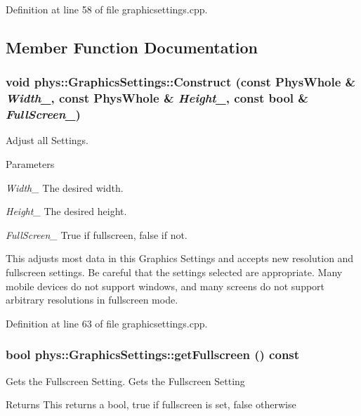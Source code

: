 Definition at line 58 of file graphicsettings.cpp.

\subsection{Member Function Documentation}
\hypertarget{classphys_1_1GraphicsSettings_aa8107167a2094f757f409db36e088171}{
\subsubsection[{Construct}]{\setlength{\rightskip}{0pt plus 5cm}void phys::GraphicsSettings::Construct (const PhysWhole \& {\em Width\_\-}, \/  const PhysWhole \& {\em Height\_\-}, \/  const bool \& {\em FullScreen\_\-})}}
\label{dc/df1/classphys_1_1GraphicsSettings_aa8107167a2094f757f409db36e088171}


Adjust all Settings. 
\begin{DoxyParams}{Parameters}
\item[{\em Width\_\-}]The desired width. \item[{\em Height\_\-}]The desired height. \item[{\em FullScreen\_\-}]True if fullscreen, false if not.\end{DoxyParams}
This adjusts most data in this Graphics Settings and accepts new resolution and fullscreen settings. Be careful that the settings selected are appropriate. Many mobile devices do not support windows, and many screens do not support arbitrary resolutions in fullscreen mode. 

Definition at line 63 of file graphicsettings.cpp.\hypertarget{classphys_1_1GraphicsSettings_a8871ea7d5c65c3b59d1d34b59531743f}{
\subsubsection[{getFullscreen}]{\setlength{\rightskip}{0pt plus 5cm}bool phys::GraphicsSettings::getFullscreen () const}}
\label{dc/df1/classphys_1_1GraphicsSettings_a8871ea7d5c65c3b59d1d34b59531743f}


Gets the Fullscreen Setting. Gets the Fullscreen Setting \begin{DoxyReturn}{Returns}
This returns a bool, true if fullscreen is set, false otherwise 
\end{DoxyReturn}


